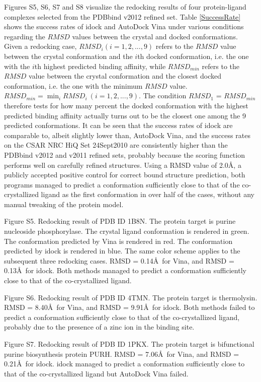 Figures S5, S6, S7 and S8 visualize the redocking results of four protein-ligand complexes selected from the PDBbind v2012 refined set. Table \ref{SuccessRate} shows the success rates of idock and AutoDock Vina under various conditions regarding the $RMSD$ values between the crystal and docked conformations. Given a redocking case, $RMSD_i (i = 1,2,...,9)$ refers to the $RMSD$ value between the crystal conformation and the $i$th docked conformation, i.e. the one with the $i$th highest predicted binding affinity, while $RMSD_{min}$ refers to the $RMSD$ value between the crystal conformation and the closest docked conformation, i.e. the one with the minimum $RMSD$ value. $RMSD_{min} = \displaystyle\min_{i}RMSD_i\ (i = 1,2,...,9)$. The condition $RMSD_1$ = $RMSD_{min}$ therefore tests for how many percent the docked conformation with the highest predicted binding affinity actually turns out to be the closest one among the 9 predicted conformations. It can be seen that the success rates of idock are comparable to, albeit slightly lower than, AutoDock Vina, and the success rates on the CSAR NRC HiQ Set 24Sept2010 are consistently higher than the PDBbind v2012 and v2011 refined sets, probably because the scoring function performs well on carefully refined structures. Using a RMSD value of 2.0\AA, a publicly accepted positive control for correct bound structure prediction, both programs managed to predict a conformation sufficiently close to that of the co-crystallized ligand as the first conformation in over half of the cases, without any manual tweaking of the protein model.

Figure S5. Redocking result of PDB ID 1B8N. The protein target is purine nucleoside phosphorylase. The crystal ligand conformation is rendered in green. The conformation predicted by Vina is rendered in red. The conformation predicted by idock is rendered in blue. The same color scheme applies to the subsequent three redocking cases. RMSD = 0.14\AA\ for Vina, and RMSD = 0.13\AA\ for idock. Both methods managed to predict a conformation sufficiently close to that of the co-crystallized ligand.

Figure S6. Redocking result of PDB ID 4TMN. The protein target is thermolysin. RMSD = 8.40\AA\ for Vina, and RMSD = 9.91\AA\ for idock. Both methods failed to predict a conformation sufficiently close to that of the co-crystallized ligand, probably due to the presence of a zinc ion in the binding site.

Figure S7. Redocking result of PDB ID 1PKX. The protein target is bifunctional purine biosynthesis protein PURH. RMSD = 7.06\AA\ for Vina, and RMSD = 0.21\AA\ for idock. idock managed to predict a conformation sufficiently close to that of the co-crystallized ligand but AutoDock Vina failed.

